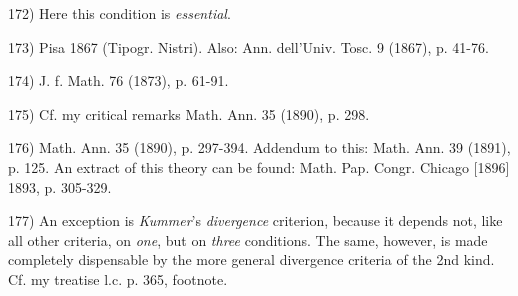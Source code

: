 \vfill
\leftline{\rule{2in}{0.4pt}}
\vspace{0.2cm}
{
\footnotesize
172) Here this condition is \textit{essential}.

173) Pisa 1867 (Tipogr. Nistri). Also: Ann. dell'Univ. Tosc. 9 (1867), p. 41-76.

174) J. f. Math. 76 (1873), p. 61-91.

175) Cf. my critical remarks Math. Ann. 35 (1890), p. 298.

176) Math. Ann. 35 (1890), p. 297-394. Addendum to this: Math. Ann. 39 (1891), p. 125. An extract of this theory can be found: Math. Pap. Congr. Chicago [1896] 1893, p. 305-329.

177) An exception is \textit{Kummer}'s \textit{divergence} criterion, because it depends not, like all other criteria, on \textit{one}, but on \textit{three} conditions. The same, however, is made completely dispensable by the more general divergence criteria of the 2nd kind. Cf. my treatise l.c. p. 365, footnote.

}